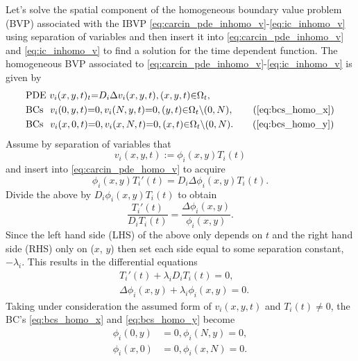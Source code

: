 \documentclass[\main/thesis.tex]{subfiles}
\begin{document}
Let's solve the spatial component of the homogeneous boundary value problem (BVP) associated with the IBVP \eqref{eq:carcin_pde_inhomo_v}-\eqref{eq:ic_inhomo_v} using separation of variables and then 
insert it into \eqref{eq:carcin_pde_inhomo_v} and \eqref{eq:ic_inhomo_v} to find a solution for the time dependent function.
The homogeneous BVP associated to \eqref{eq:carcin_pde_inhomo_v}-\eqref{eq:ic_inhomo_v} is given by
\begin{align}
&\text{PDE } v_i(x, y, t)_t {=} D_i \Delta v_i(x, y, t), (x, y, t) {\in} \Omega_t,
\label{eq:carcin_pde_homo_v} \\
&\text{BCs } \hspace{0.05in}v_i(0, y, t) {=} 0, v_i(N, y, t) {=} 0, (y, t) {\in} \Omega_t {\setminus} (0, N), \tag{\ref{eq:bcs_homo_x}} \\
&\text{BCs } \hspace{0.05in}v_i(x, 0, t) {=} 0, v_i(x, N, t) {=} 0, (x, t) {\in} \Omega_t {\setminus} (0, N). \tag{\ref{eq:bcs_homo_y}} 
\end{align}
Assume by separation of variables that 
\begin{equation*}
v_i(x, y, t) {:=} \phi_i(x, y)T_i(t)
\end{equation*}
and insert into \eqref{eq:carcin_pde_homo_v} to acquire
\begin{equation*}
\phi_i(x, y)T_i'(t) {=} D_i\Delta \phi_i(x, y)T_i(t).
\end{equation*}
Divide the above by $D_i\phi_i(x, y)T_i(t)$ to obtain
\begin{equation*}
\frac{T_i'(t)}{D_iT_i(t)} {=} \frac{\Delta \phi_i(x, y)}{\phi_i(x, y)}.
\end{equation*}
Since the left hand side (LHS) of the above only depends on $t$ and the right hand side (RHS) only on ($x$, $y$) then set each side equal to some separation constant, $\minus \lambda_i$.
This results in the differential equations
\begin{align}
&T_i'(t) {+} \lambda_i D_i T_i(t) {=} 0, \nonumber \\
&\Delta \phi_i(x, y) {+} \lambda_i \phi_i(x, y) {=} 0.
\label{eq:spatial_pde}
\end{align}
Taking under consideration the assumed form of $v_i(x, y, t)$ and $T_i(t) {\ne} 0$, the BC's \eqref{eq:bcs_homo_x} and \eqref{eq:bcs_homo_y} become
\begin{align}
\phi_i(0, y) &{=} 0, \phi_i(N, y) {=} 0,
\label{eq:bcs_homo_phi_x} \\
\phi_i(x, 0) &{=} 0, \phi_i(x, N) {=} 0.
\label{eq:bcs_homo_phi_y}
\end{align}
\end{document}
